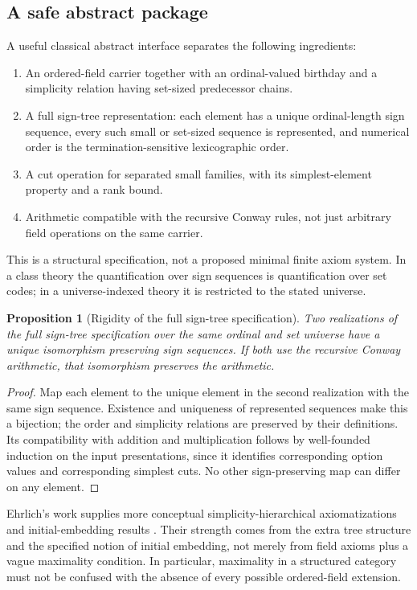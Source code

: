 \documentclass[11pt,letterpaper]{article}
\numberwithin{equation}{section}
\newtheorem{proposition}[theorem]{Proposition}
\theoremstyle{definition}
\theoremstyle{remark}
\begin{document}
\subsection{A safe abstract package}
A useful classical abstract interface separates the following ingredients:
\begin{enumerate}
\item An ordered-field carrier together with an ordinal-valued birthday and a simplicity relation having set-sized predecessor chains.
\item A full sign-tree representation: each element has a unique ordinal-length sign sequence, every such small or set-sized sequence is represented, and numerical order is the termination-sensitive lexicographic order.
\item A cut operation for separated small families, with its simplest-element property and a rank bound.
\item Arithmetic compatible with the recursive Conway rules, not just arbitrary field operations on the same carrier.
\end{enumerate}
This is a structural specification, not a proposed minimal finite axiom system. In a class theory the quantification over sign sequences is quantification over set codes; in a universe-indexed theory it is restricted to the stated universe.

\begin{proposition}[Rigidity of the full sign-tree specification]\label{prop:rigidity}
Two realizations of the full sign-tree specification over the same ordinal and set universe have a unique isomorphism preserving sign sequences. If both use the recursive Conway arithmetic, that isomorphism preserves the arithmetic.
\end{proposition}
\begin{proof}
Map each element to the unique element in the second realization with the same sign sequence. Existence and uniqueness of represented sequences make this a bijection; the order and simplicity relations are preserved by their definitions. Its compatibility with addition and multiplication follows by well-founded induction on the input presentations, since it identifies corresponding option values and corresponding simplest cuts. No other sign-preserving map can differ on any element.
\end{proof}

Ehrlich's work supplies more conceptual simplicity-hierarchical axiomatizations and initial-embedding results \cite{Ehrlich,EKHierarchy}. Their strength comes from the extra tree structure and the specified notion of initial embedding, not merely from field axioms plus a vague maximality condition. In particular, maximality in a structured category must not be confused with the absence of every possible ordered-field extension.
\end{document}
